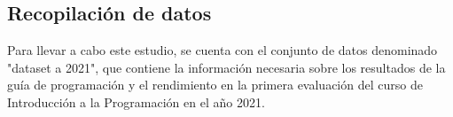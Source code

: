 \subsection{Recopilación de datos}

Para llevar a cabo este estudio, se cuenta con el conjunto de datos denominado "dataset a 2021", que contiene la información necesaria sobre los
resultados de la guía de programación y el rendimiento en la primera evaluación del curso de Introducción a la Programación en el año 2021.


